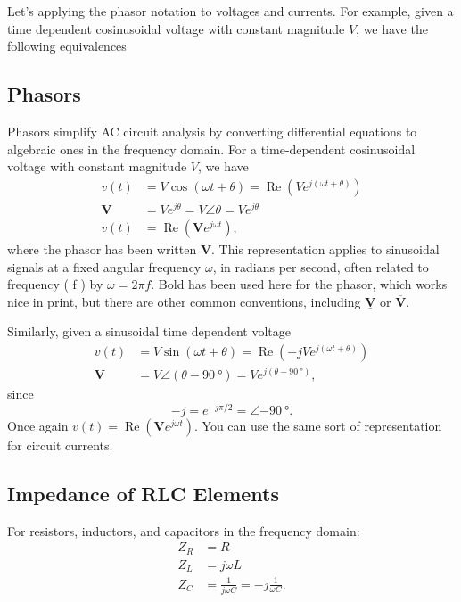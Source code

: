 \documentclass[letterpaper]{scrartcl}
\newcommand{\lr}[1]{\left(#1\right)}
\DeclareMathOperator{\Real}{Re}
\newcommand{\phasor}[1]{\mathbf{#1}}
\begin{document}
Let's applying the phasor notation to voltages and currents.  For example, given a time dependent cosinusoidal voltage with constant magnitude \( V \), we have the following equivalences

\subsection*{Phasors}
Phasors simplify AC circuit analysis by converting differential equations to algebraic ones in the frequency domain. For a time-dependent cosinusoidal voltage with constant magnitude \( V \), we have
\begin{equation}\label{eqn:karlCircuitsCheatSheet:260}
\begin{aligned}
v(t)       &= V \cos\lr{ \omega t + \theta } = \Real \lr{ V e^{j \lr{\omega t + \theta} } } \\
\phasor{V} &= V e^{j \theta} = V \angle \theta = V e^{j \theta} \\
v(t)       &= \Real \lr{ \phasor{V} e^{j \omega t} },
\end{aligned}
\end{equation}
where the phasor has been written \( \phasor{V} \).  This representation applies to
sinusoidal signals at a fixed angular frequency \( \omega \), in radians per second, often related to frequency ( f ) by \( \omega = 2 \pi f \).
Bold has been used here for the phasor, which works nice in print, but there are other common conventions, including \(\underline{\phasor{V}}\) or \(\overline{\phasor{V}}\).

Similarly, given a sinusoidal time dependent voltage
\begin{equation}\label{eqn:karlCircuitsCheatSheet:320}
\begin{aligned}
v(t)       &= V \sin\lr{ \omega t + \theta }            = \Real \lr{ -j V e^{j\lr{ \omega t + \theta } } } \\
\phasor{V} &= V \angle \lr{ \theta - \SI{90}{\degree}}  = V e^{j \lr{ \theta - \SI{90}{\degree}} },
\end{aligned}
\end{equation}
since
\begin{equation}\label{eqn:karlCircuitsCheatSheet:400}
-j = e^{-j \pi/2} = \angle \SI{-90}{\degree}.
\end{equation}
Once again \( v(t) = \Real \lr{ \phasor{V} e^{j \omega t} } \).  You can use the same sort of representation for circuit currents.

\subsection*{Impedance of RLC Elements}
For resistors, inductors, and capacitors in the frequency domain:
\begin{equation}\label{eqn:karlCircuitsCheatSheet:460}
\begin{aligned}
Z_R &= R \\
Z_L &= j \omega L \\
Z_C &= \frac{1}{j \omega C} = -j \frac{1}{\omega C}.
\end{aligned}
\end{equation}
\end{document}
